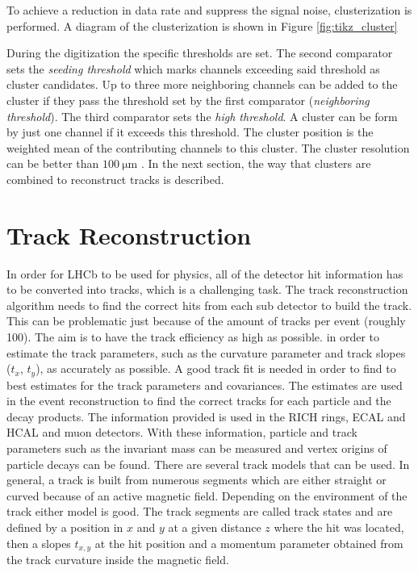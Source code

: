 To achieve a reduction in data rate and suppress the signal noise, clusterization is performed. A diagram of the clusterization is shown in Figure \ref{fig:tikz_cluster}



During the digitization the specific thresholds are set. The second comparator sets the \textit{seeding threshold} which marks channels exceeding said threshold as cluster candidates. Up to three more neighboring channels can be added to the cluster if they pass the threshold set by the first comparator (\textit{neighboring threshold}).
The third comparator sets the \textit{high threshold}. A cluster can be form by just one channel if it exceeds this threshold.
The cluster position is the weighted mean of the contributing channels to this cluster. The cluster resolution can be better than $\SI{100}{\micro\metre}$ \cite{techreport}. In the next section, the way that clusters are combined to reconstruct tracks is described.

\section{Track Reconstruction}
\label{sec:kalman}

In order for LHCb to be used for physics, all of the detector hit information has to be converted into tracks, which is a challenging task.
The track reconstruction algorithm needs to find the correct hits from each sub detector to build the track. This can be problematic just because of the amount of tracks per event (roughly 100).
The aim is to have the track efficiency as high as possible. in order to estimate the track parameters, such as the curvature parameter and track slopes ($t_x$, $t_y$), as accurately as possible.
A good track fit is needed in order to find to best estimates for the track parameters and covariances. The estimates are used in the event reconstruction to find the correct tracks for each particle and the decay products. The information provided is used in the RICH rings, ECAL and HCAL and muon detectors. With these information, particle and track parameters such as the invariant mass can be measured and vertex origins of particle decays can be found.
There are several track models that can be used. In general, a track is built from numerous segments which are either straight or curved because of an active magnetic field. Depending on the environment of the track either model is good.
The track segments are called track states and are defined by a position in $x$ and $y$ at a given distance $z$ where the hit was located, then a slopes $t_{x,y}$ at the hit position and a momentum parameter obtained from the track curvature inside the magnetic field\cite{VanTilburg}.

